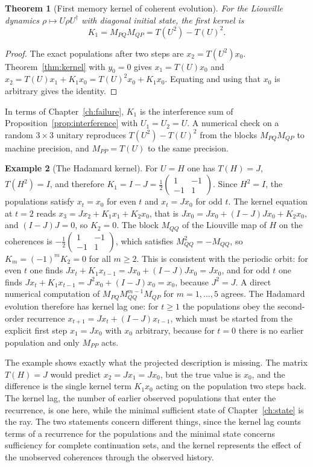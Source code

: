 \documentclass[11pt,oneside]{book}
\newtheorem{theorem}{Theorem}[chapter]
\theoremstyle{definition}
\newtheorem{example}[theorem]{Example}
\theoremstyle{remark}
\begin{document}
\begin{theorem}[First memory kernel of coherent evolution]\label{thm:K1}
For the Liouville dynamics $\rho\mapsto U\rho U^\dagger$ with diagonal initial state, the first kernel is
\[
K_1=M_{PQ}M_{QP}=T(U^2)-T(U)^2 .
\]
\end{theorem}

\begin{proof}
The exact populations after two steps are $x_2=T(U^2)x_0$. Theorem~\ref{thm:kernel} with $y_0=0$ gives $x_1=T(U)x_0$ and $x_2=T(U)x_1+K_1x_0=T(U)^2x_0+K_1x_0$. Equating and using that $x_0$ is arbitrary gives the identity.
\end{proof}

In terms of Chapter~\ref{ch:failure}, $K_1$ is the interference sum of Proposition~\ref{prop:interference} with $U_1=U_2=U$. A numerical check on a random $3\times3$ unitary reproduces $T(U^2)-T(U)^2$ from the blocks $M_{PQ}M_{QP}$ to machine precision, and $M_{PP}=T(U)$ to the same precision.

\begin{example}[The Hadamard kernel]\label{ex:hadamard-kernel}
For $U=H$ one has $T(H)=J$, $T(H^2)=I$, and therefore $K_1=I-J=\tfrac12\begin{pmatrix}1&-1\\-1&1\end{pmatrix}$. Since $H^2=I$, the populations satisfy $x_t=x_0$ for even $t$ and $x_t=Jx_0$ for odd $t$. The kernel equation at $t=2$ reads $x_3=Jx_2+K_1x_1+K_2x_0$, that is $Jx_0=Jx_0+(I-J)Jx_0+K_2x_0$, and $(I-J)J=0$, so $K_2=0$. The block $M_{QQ}$ of the Liouville map of $H$ on the coherences is $-\tfrac12\begin{pmatrix}1&-1\\-1&1\end{pmatrix}$, which satisfies $M_{QQ}^2=-M_{QQ}$, so $K_m=(-1)^mK_2=0$ for all $m\geq2$. This is consistent with the periodic orbit: for even $t$ one finds $Jx_t+K_1x_{t-1}=Jx_0+(I-J)Jx_0=Jx_0$, and for odd $t$ one finds $Jx_t+K_1x_{t-1}=J^2x_0+(I-J)x_0=x_0$, because $J^2=J$. A direct numerical computation of $M_{PQ}M_{QQ}^{m-1}M_{QP}$ for $m=1,\dots,5$ agrees. The Hadamard evolution therefore has kernel lag one: for $t\geq1$ the populations obey the second-order recurrence $x_{t+1}=Jx_t+(I-J)x_{t-1}$, which must be started from the explicit first step $x_1=Jx_0$ with $x_0$ arbitrary, because for $t=0$ there is no earlier population and only $M_{PP}$ acts.
\end{example}

The example shows exactly what the projected description is missing. The matrix $T(H)=J$ would predict $x_2=Jx_1=Jx_0$, but the true value is $x_0$, and the difference is the single kernel term $K_1x_0$ acting on the population two steps back. The kernel lag, the number of earlier observed populations that enter the recurrence, is one here, while the minimal sufficient state of Chapter~\ref{ch:state} is the ray. The two statements concern different things, since the kernel lag counts terms of a recurrence for the populations and the minimal state concerns sufficiency for complete continuation sets, and the kernel represents the effect of the unobserved coherences through the observed history.
\end{document}
